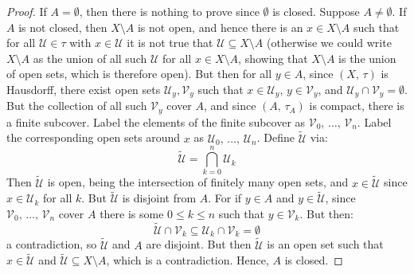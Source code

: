 \documentclass{article}
\theoremstyle{plain}
\theoremstyle{normal}
\begin{document}
        \begin{proof}
            If $A=\emptyset$, then there is nothing to prove since $\emptyset$
            is closed. Suppose $A\ne\emptyset$. If $A$ is not closed, then
            $X\setminus{A}$ is not open, and hence there is an
            $x\in{X}\setminus{A}$ such that for all $\mathcal{U}\in\tau$ with
            $x\in\mathcal{U}$ it is not true that
            $\mathcal{U}\subseteq{X}\setminus{A}$ (otherwise we could write
            $X\setminus{A}$ as the union of all such $\mathcal{U}$ for all
            $x\in{X}\setminus{A}$, showing that $X\setminus{A}$ is the union of
            open sets, which is therefore open). But then for all $y\in{A}$,
            since $(X,\,\tau)$ is Hausdorff, there
            exist open sets $\mathcal{U}_{y},\mathcal{V}_{y}$ such that
            $x\in\mathcal{U}_{y}$, $y\in\mathcal{V}_{y}$, and
            $\mathcal{U}_{y}\cap\mathcal{V}_{y}=\emptyset$. But the collection
            of all such $\mathcal{V}_{y}$ cover $A$, and since
            $(A,\,\tau_{A})$ is compact, there is a finite subcover. Label the
            elements of the finite subcover as
            $\mathcal{V}_{0},\,\dots,\,\mathcal{V}_{n}$. Label the corresponding
            open sets around $x$ as $\mathcal{U}_{0},\,\dots,\,\mathcal{U}_{n}$.
            Define $\tilde{\mathcal{U}}$ via:
            \begin{equation}
                \tilde{\mathcal{U}}=\bigcap_{k=0}^{n}\mathcal{U}_{k}
            \end{equation}
            Then $\tilde{\mathcal{U}}$ is open, being the intersection of
            finitely many open sets, and
            $x\in\tilde{\mathcal{U}}$ since $x\in\mathcal{U}_{k}$
            for all $k$. But $\tilde{\mathcal{U}}$ is disjoint from
            $A$. For if $y\in{A}$ and $y\in\tilde{\mathcal{U}}$, since
            $\mathcal{V}_{0},\,\dots,\,\mathcal{V}_{n}$ cover $A$ there is some
            $0\leq{k}\leq{n}$ such that $y\in\mathcal{V}_{k}$. But then:
            \begin{equation}
                \tilde{\mathcal{U}}\cap\mathcal{V}_{k}
                \subseteq\mathcal{U}_{k}\cap\mathcal{V}_{k}
                =\emptyset
            \end{equation}
            a contradiction, so $\tilde{\mathcal{U}}$ and $A$ are disjoint.
            But then $\tilde{\mathcal{U}}$ is an open set such that
            $x\in\tilde{\mathcal{U}}$ and
            $\tilde{\mathcal{U}}\subseteq{X}\setminus{A}$, which is a
            contradiction. Hence, $A$ is closed.
        \end{proof}
\end{document}
